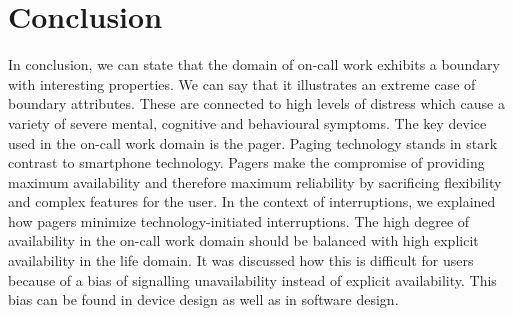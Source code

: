 \documentclass{CML_Seminar_Template}
\begin{document}
\section{Conclusion}
In conclusion, we can state that the domain of on-call work exhibits a boundary with interesting properties. We can say that it illustrates an extreme case of boundary attributes. These are connected to high levels of distress which cause a variety of severe mental, cognitive and behavioural symptoms. The key device used in the on-call work domain is the pager. Paging technology stands in stark contrast to smartphone technology. Pagers make the compromise of providing maximum availability and therefore maximum reliability by sacrificing flexibility and complex features for the user. In the context of interruptions, we explained how pagers minimize technology-initiated interruptions. The high degree of availability in the on-call work domain should be balanced with high explicit availability in the life domain. It was discussed how this is difficult for users because of a bias of signalling unavailability instead of explicit availability. This bias can be found in device design as well as in software design.

%
%
%
%
%
%
%
%
%
%
%


%


\end{document}
